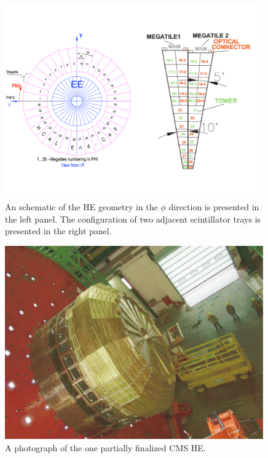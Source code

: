\begin{figure}
 \centering
\includegraphics[width=0.99\textwidth]{CMS_DetectorFigures/hca_tile.pdf}
\caption{An schematic of the HE geometry in the $\phi$ direction is
  presented in the left panel. The configuration of two adjacent
  scintillator trays is presented in the right panel.\label{fig:HEtiles}}
\end{figure}
\begin{figure}
 \centering
\includegraphics[width=0.99\textwidth]{CMS_DetectorFigures/hcal_HE.pdf}
\caption{A photograph of the one partially finalized CMS HE.\label{fig:HE}}
\end{figure}

